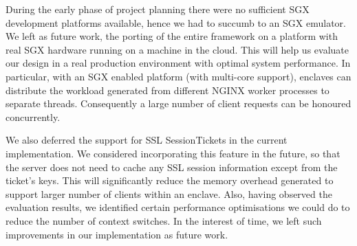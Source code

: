 \documentclass[../main.tex]{subfiles}
\begin{document}
During the early phase of project planning there were no sufficient SGX
development platforms available, hence we had to succumb to an SGX emulator. We
left as future work, the porting of the entire framework on a platform with real SGX
hardware running on a machine in the cloud. This will help us evaluate our
design in a real production environment with optimal system performance. In
particular, with an SGX enabled platform (with multi-core support), enclaves
can distribute the workload generated from different NGINX worker processes to
separate threads. Consequently a large number of client requests can be
honoured concurrently.

We also deferred the support for SSL SessionTickets in the current
implementation. We considered incorporating this feature in the future, so that the
server does not need to cache any SSL session information except from the
ticket's keys. This will significantly reduce the memory overhead generated to
support larger number of clients within an enclave. Also, having observed the
evaluation results, we identified certain performance optimisations we could do
to reduce the number of context switches. In the interest of time, we left
such improvements in our implementation as future work.
\end{document}
